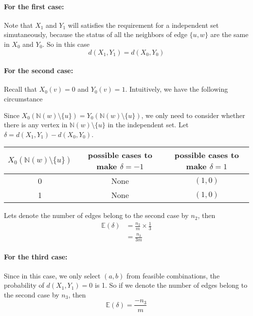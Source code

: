 \documentclass{article}
\begin{document}
\paragraph{For the first case:}
Note that $X_1$ and $Y_1$ will satisfies the requirement for a independent set simutaneously, because the status of all the neighbors of edge $\{u, w\}$ are the same in $X_0$ and $Y_0$. So in this case
\[d(X_1, Y_1) = d(X_0, Y_0)\]
\paragraph{For the second case:}
Recall that $X_0(v) = 0$ and $Y_0(v) = 1$.
Intuitively, we have the following circumstance
\begin{center}
\end{center}
Since $X_0(\mathbb{N}(w)\setminus\{u\}) = Y_0(\mathbb{N}(w)\setminus\{u\})$, we only need to consider whether there is any vertex in $\mathbb{N}(w)\setminus\{u\}$ in the independent set. Let $\delta = d(X_1, Y_1) - d(X_0, Y_0)$.
\begin{center}
  \begin{tabular}{|c|c|c|}
    \hline
    $X_0(\mathbb{N}(w)\setminus\{u\})$ & possible cases to make $\delta = -1$ & possible cases to make $\delta = 1$ \\
    \hline
    0 & None & $(1, 0)$ \\
    \hline
    1 & None & $(1, 0)$ \\
    \hline
  \end{tabular}
\end{center}
Lets denote the number of edges belong to the second case by $n_2$, then
\begin{align*}
  \mathbb{E}(\delta) &= \frac{n_2}{m} \times \frac{1}{3} \\
  &= \frac{n_2}{3m}
\end{align*}

\paragraph{For the third case:}
Since in this case, we only select $(a, b)$ from feasible combinations, the probability of $d(X_1, Y_1) = 0$ is 1. So if we denote the number of edges belong to the second case by $n_3$, then
\[\mathbb{E}(\delta) = \frac{-n_3}{m}\]
\end{document}
